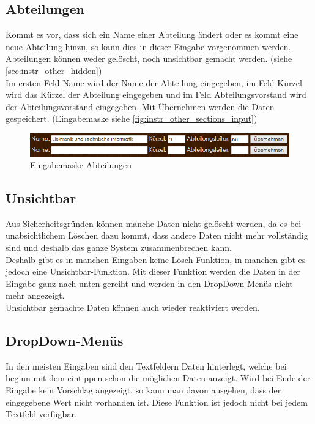 \subsection{Abteilungen}
Kommt es vor, dass sich ein Name einer Abteilung ändert oder es kommt eine neue Abteilung hinzu, so kann dies in dieser Eingabe vorgenommen werden. Abteilungen können weder gelöscht, noch unsichtbar gemacht werden. (siehe \autoref{sec:instr_other_hidden})\\
Im ersten Feld Name wird der Name der Abteilung eingegeben, im Feld Kürzel wird das Kürzel der Abteilung eingegeben und im Feld Abteilungsvorstand wird der Abteilungsvorstand eingegeben. Mit Übernehmen werden die Daten gespeichert. (Eingabemaske siehe \autoref{fig:instr_other_sections_input})
\begin{figure}[H]
\centering
\includegraphics[keepaspectratio=true, width=17cm]{images/screenshots/sections_input.png}
\caption{Eingabemaske Abteilungen}
\label{fig:instr_other_sections_input}
\end{figure}
\subsection{Unsichtbar}\label{sec:instr_other_hidden}
Aus Sicherheitsgründen können manche Daten nicht gelöscht werden, da es bei unabsichtlichem Löschen dazu kommt, dass andere Daten nicht mehr vollständig sind und deshalb das ganze System zusammenbrechen kann.\\
Deshalb gibt es in manchen Eingaben keine Lösch-Funktion, in manchen gibt es jedoch eine Unsichtbar-Funktion. Mit dieser Funktion werden die Daten in der Eingabe ganz nach unten gereiht und werden in den DropDown Menüs nicht mehr angezeigt.\\
Unsichtbar gemachte Daten können auch wieder reaktiviert werden.
\subsection{DropDown-Menüs}
In den meisten Eingaben sind den Textfeldern Daten hinterlegt, welche bei beginn mit dem eintippen schon die möglichen Daten anzeigt. Wird bei Ende der Eingabe kein Vorschlag angezeigt, so kann man davon ausgehen, dass der eingegebene Wert nicht vorhanden ist. Diese Funktion ist jedoch nicht bei jedem Textfeld verfügbar.
